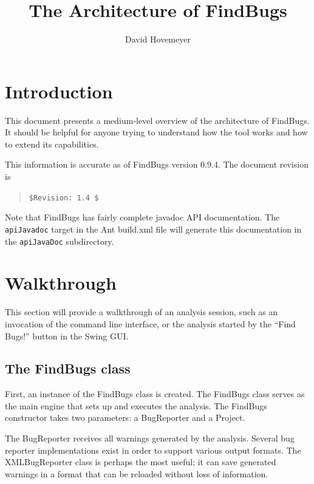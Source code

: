 \documentclass[11pt]{article}
\title{The Architecture of FindBugs}
\author{David Hovemeyer}
\date{}
\begin{document}
\maketitle
\tableofcontents

\section*{Introduction}

This document presents a medium-level overview of the architecture
of FindBugs.  It should be helpful for anyone trying to understand how
the tool works and how to extend its capabilities.

This information is accurate as of FindBugs version 0.9.4.
The document revision is
\begin{quote}
\verb+$Revision: 1.4 $+
\end{quote}

Note that FindBugs has fairly complete javadoc API documentation.
The {\tt apiJavadoc} target in the Ant build.xml file will generate
this documentation in the {\tt apiJavaDoc} subdirectory.

\section{Walkthrough}

This section will provide a walkthrough of an analysis session,
such as an invocation of the command line interface, or the analysis
started by the ``Find Bugs!'' button in the Swing GUI.

\subsection{The FindBugs class}


First, an instance of the FindBugs class is created.
The FindBugs class serves as the main engine that sets up and executes the
analysis.  The FindBugs constructor takes
two parameters: a BugReporter and a Project.

The BugReporter receives all warnings generated by the analysis.
Several bug reporter implementations exist in order to support various
output formats.  The XMLBugReporter class is perhaps the most useful;
it can save generated warnings in a format that can be reloaded without
loss of information.  
\end{document}
